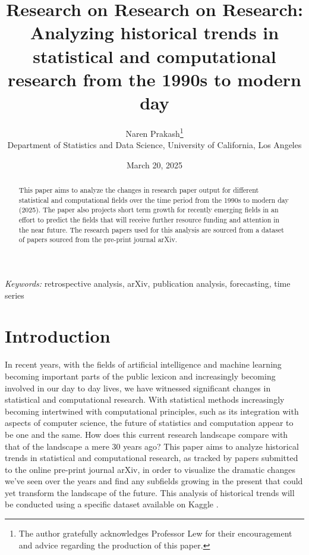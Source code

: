 \documentclass[
  12pt]{article}
\begin{document}
\def\spacingset#1{\renewcommand{\baselinestretch}%
{#1}\small\normalsize} \spacingset{1}



\date{March 20, 2025}
\title{\bf Research on Research on Research: Analyzing historical trends
in statistical and computational research from the 1990s to modern day}
\author{
Naren Prakash\thanks{The author gratefully acknowledges Professor Lew
for their encouragement and advice regarding the production of this
paper.}\\
Department of Statistics and Data Science, University of California, Los
Angeles\\
}
\maketitle

\bigskip
\bigskip
\begin{abstract}
This paper aims to analyze the changes in research paper output for
different statistical and computational fields over the time period from
the 1990s to modern day (2025). The paper also projects short term
growth for recently emerging fields in an effort to predict the fields
that will receive further resource funding and attention in the near
future. The research papers used for this analysis are sourced from a
dataset of papers sourced from the pre-print journal arXiv.
\end{abstract}

\noindent%
{\it Keywords:} retrospective analysis, arXiv, publication analysis,
forecasting, time series
\vfill

\newpage
\spacingset{1.9} %


\section{Introduction}\label{sec-intro}

In recent years, with the fields of artificial intelligence and machine
learning becoming important parts of the public lexicon and increasingly
becoming involved in our day to day lives, we have witnessed significant
changes in statistical and computational research. With statistical
methods increasingly becoming intertwined with computational principles,
such as its integration with aspects of computer science, the future of
statistics and computation appear to be one and the same. How does this
current research landscape compare with that of the landscape a mere 30
years ago? This paper aims to analyze historical trends in statistical
and computational research, as tracked by papers submitted to the online
pre-print journal arXiv, in order to visualize the dramatic changes
we've seen over the years and find any subfields growing in the present
that could yet transform the landscape of the future. This analysis of
historical trends will be conducted using a specific dataset available
on Kaggle \citet{arXiv:kaggle:data}.
\end{document}
